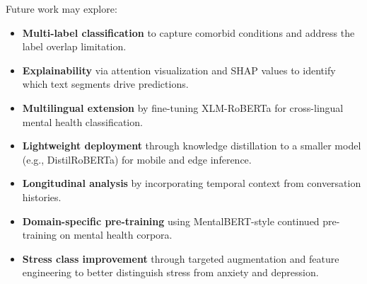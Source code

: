 \documentclass[conference, 10pt]{IEEEtran}
\begin{document}
Future work may explore:
\begin{itemize}[noitemsep]
    \item \textbf{Multi-label classification} to capture comorbid conditions and address the label overlap limitation.
    \item \textbf{Explainability} via attention visualization and SHAP values to identify which text segments drive predictions.
    \item \textbf{Multilingual extension} by fine-tuning XLM-RoBERTa for cross-lingual mental health classification.
    \item \textbf{Lightweight deployment} through knowledge distillation to a smaller model (e.g., DistilRoBERTa) for mobile and edge inference.
    \item \textbf{Longitudinal analysis} by incorporating temporal context from conversation histories.
    \item \textbf{Domain-specific pre-training} using MentalBERT-style continued pre-training on mental health corpora.
    \item \textbf{Stress class improvement} through targeted augmentation and feature engineering to better distinguish stress from anxiety and depression.
\end{itemize}
\end{document}
